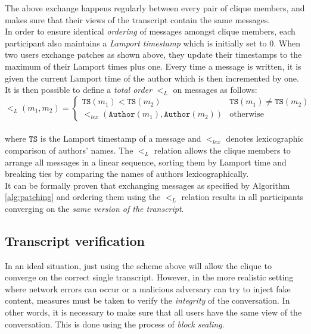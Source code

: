 \documentclass[a4paper, twoside, 12pt]{report}
\begin{document}
\restoregeometry


The above exchange happens regularly between every pair of clique members, and makes sure that their views of the transcript contain the same messages. \\

In order to ensure identical \emph{ordering} of messages amongst clique members, each participant also maintains a \emph{Lamport timestamp} which is initially set to 0. When two users exchange patches as shown above, they update their timestamps to the maximum of their Lamport times plus one. Every time a message is written, it is given the current Lamport time of the author which is then incremented by one. It is then possible to define a \emph{total order} $<_L$ on messages as follows:\\

\[
    <_L(m_1, m_2) = 
        \begin{cases}
            \mathtt{TS}(m_1) < \mathtt{TS}(m_2) & \mathtt{TS}(m_1) \neq \mathtt{TS}(m_2) \\
            <_{lex}(\mathtt{Author}(m_1), \mathtt{Author}(m_2)) & \text{otherwise}
        \end{cases}
\] \\

where $\mathtt{TS}$ is the Lamport timestamp of a message and $<_{lex}$ denotes lexicographic comparison of authors' names. The $<_L$ relation allows the clique members to arrange all messages in a linear sequence, sorting them by Lamport time and breaking ties by comparing the names of authors lexicographically. \\ 

It can be formally proven \cite{reardon2007kleeq} that exchanging messages as specified by Algorithm \ref{alg:patching} and ordering them using the $<_L$ relation results in all participants converging on the \emph{same version of the transcript}.


\subsection{Transcript verification}
\label{subsec:prep.sealing}
In an ideal situation, just using the scheme above will allow the clique to converge on the correct single transcript. However, in the more realistic setting where network errors can occur or a malicious adversary can try to inject fake content, measures must be taken to verify the \emph{integrity} of the conversation. In other words, it is necessary to make sure that all users have the same view of the conversation. This is done using the process of \emph{block sealing}. \\
\end{document}
